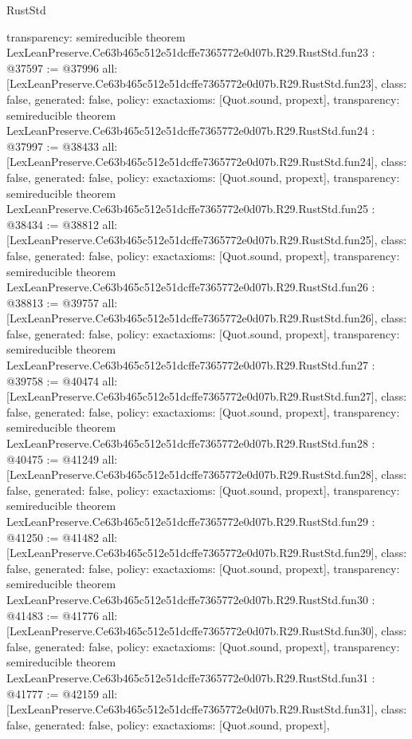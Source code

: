 \begin{lexlean}{RustStd}
\begin{coremodule}
{  transparency: semireducible
}
theorem LexLeanPreserve.Ce63b465c512e51dcffe7365772e0d07b.R29.RustStd.fun23 : @37597 := @37996 {
  all: [LexLeanPreserve.Ce63b465c512e51dcffe7365772e0d07b.R29.RustStd.fun23],
  class: false,
  generated: false,
  policy: exact{axioms: [Quot.sound, propext]},
  transparency: semireducible
}
theorem LexLeanPreserve.Ce63b465c512e51dcffe7365772e0d07b.R29.RustStd.fun24 : @37997 := @38433 {
  all: [LexLeanPreserve.Ce63b465c512e51dcffe7365772e0d07b.R29.RustStd.fun24],
  class: false,
  generated: false,
  policy: exact{axioms: [Quot.sound, propext]},
  transparency: semireducible
}
theorem LexLeanPreserve.Ce63b465c512e51dcffe7365772e0d07b.R29.RustStd.fun25 : @38434 := @38812 {
  all: [LexLeanPreserve.Ce63b465c512e51dcffe7365772e0d07b.R29.RustStd.fun25],
  class: false,
  generated: false,
  policy: exact{axioms: [Quot.sound, propext]},
  transparency: semireducible
}
theorem LexLeanPreserve.Ce63b465c512e51dcffe7365772e0d07b.R29.RustStd.fun26 : @38813 := @39757 {
  all: [LexLeanPreserve.Ce63b465c512e51dcffe7365772e0d07b.R29.RustStd.fun26],
  class: false,
  generated: false,
  policy: exact{axioms: [Quot.sound, propext]},
  transparency: semireducible
}
theorem LexLeanPreserve.Ce63b465c512e51dcffe7365772e0d07b.R29.RustStd.fun27 : @39758 := @40474 {
  all: [LexLeanPreserve.Ce63b465c512e51dcffe7365772e0d07b.R29.RustStd.fun27],
  class: false,
  generated: false,
  policy: exact{axioms: [Quot.sound, propext]},
  transparency: semireducible
}
theorem LexLeanPreserve.Ce63b465c512e51dcffe7365772e0d07b.R29.RustStd.fun28 : @40475 := @41249 {
  all: [LexLeanPreserve.Ce63b465c512e51dcffe7365772e0d07b.R29.RustStd.fun28],
  class: false,
  generated: false,
  policy: exact{axioms: [Quot.sound, propext]},
  transparency: semireducible
}
theorem LexLeanPreserve.Ce63b465c512e51dcffe7365772e0d07b.R29.RustStd.fun29 : @41250 := @41482 {
  all: [LexLeanPreserve.Ce63b465c512e51dcffe7365772e0d07b.R29.RustStd.fun29],
  class: false,
  generated: false,
  policy: exact{axioms: [Quot.sound, propext]},
  transparency: semireducible
}
theorem LexLeanPreserve.Ce63b465c512e51dcffe7365772e0d07b.R29.RustStd.fun30 : @41483 := @41776 {
  all: [LexLeanPreserve.Ce63b465c512e51dcffe7365772e0d07b.R29.RustStd.fun30],
  class: false,
  generated: false,
  policy: exact{axioms: [Quot.sound, propext]},
  transparency: semireducible
}
theorem LexLeanPreserve.Ce63b465c512e51dcffe7365772e0d07b.R29.RustStd.fun31 : @41777 := @42159 {
  all: [LexLeanPreserve.Ce63b465c512e51dcffe7365772e0d07b.R29.RustStd.fun31],
  class: false,
  generated: false,
  policy: exact{axioms: [Quot.sound, propext]},
}
\end{coremodule}
\end{lexlean}
